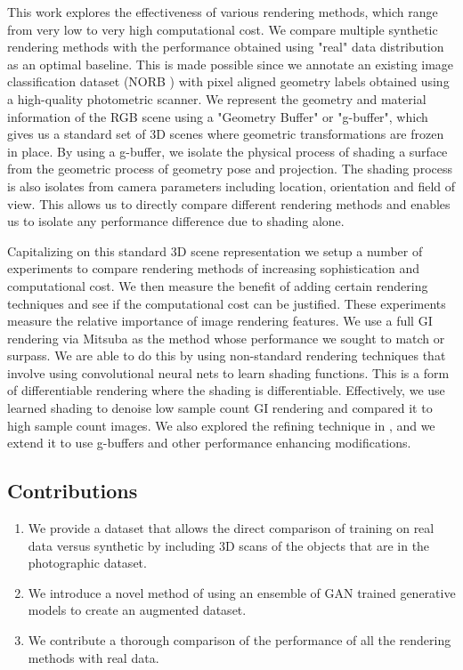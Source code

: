 \documentclass[10pt,twocolumn,letterpaper]{article}
\begin{document}
This work explores the effectiveness of various rendering methods, which range from very low to very high computational cost. We compare multiple synthetic rendering methods with the performance obtained using "real" data distribution as an optimal baseline. This is made possible since we annotate an existing image classification dataset (NORB \cite{LeCun:2004:LMG:1896300.1896315}) with pixel aligned geometry labels obtained using a high-quality photometric scanner. We represent the geometry and material information of the RGB scene using a "Geometry Buffer" or "g-buffer", which gives us a standard set of 3D scenes where geometric transformations are frozen in place. By using a g-buffer, we isolate the physical process of shading a surface from the geometric process of geometry pose and projection.  The shading process is also isolates from camera parameters including location, orientation and field of view. This allows us to directly compare different rendering methods and enables us to isolate any performance difference due to shading alone.

Capitalizing on this standard 3D scene representation we setup a number of experiments to compare rendering methods of increasing sophistication and computational cost.  We then measure the benefit of adding certain rendering techniques and see if the computational cost can be justified.  These experiments measure the relative importance of image rendering features. We use a full GI rendering via Mitsuba as the method whose performance we sought to match or surpass.
We are able to do this by using non-standard rendering techniques that involve using convolutional neural nets to learn shading functions.  This is a form of differentiable rendering where the shading is differentiable. Effectively, we use learned shading to denoise low sample count GI rendering and compared it to high sample count images.  We also explored the refining technique in \cite{DBLP:journals/corr/ShrivastavaPTSW16}, and we extend it to use g-buffers and other performance enhancing modifications.

\subsection{Contributions}
\begin{enumerate}
\item We provide a dataset that allows the direct comparison of training on real data versus synthetic by including 3D scans of the objects that are in the photographic dataset.
\item We introduce a novel method of using an ensemble of GAN trained generative models to create an augmented dataset.
\item We contribute a thorough comparison of the performance of all the rendering methods with real data.
\end{enumerate}
\end{document}
